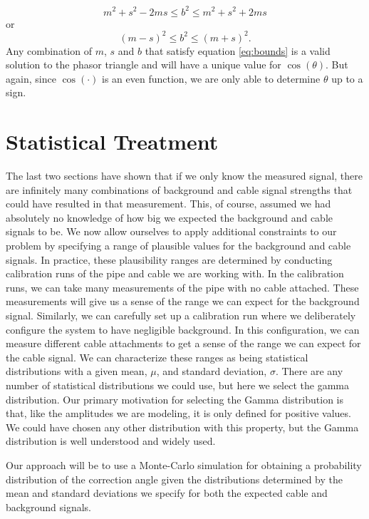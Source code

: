 \documentclass[paper=a4, fontsize=11pt]{scrartcl}
\numberwithin{equation}{section}		%
\numberwithin{figure}{section}			%
\numberwithin{table}{section}				%
\begin{document}
\begin{appendices}
\begin{equation*}
      m^2 + s^2 - 2 m s \leq b ^ 2 \leq  m^2 + s^2 + 2 m s
\end{equation*}
or
\begin{equation} \label{eq:bounds}
      \left(m-s\right)^2 \leq b ^ 2 \leq \left(m + s\right)^2.  
\end{equation}
Any combination of $m$, $s$ and $b$ that satisfy equation \ref{eq:bounds} is a valid solution to the phasor triangle and will have a unique value for $\cos\left(\theta\right)$.  But again, since $\cos\left(\cdot\right)$ is an even function, we are only able to determine $\theta$ up to a sign.
    
\section{Statistical Treatment}
The last two sections have shown that if we only know the measured signal, there are infinitely many combinations of background and cable signal strengths that could have resulted in that measurement.  This, of course, assumed we had absolutely no knowledge of how big we expected the background and cable signals to be.  We now allow ourselves to apply additional constraints to our problem by specifying a range of plausible values for the background and cable signals.  In practice, these plausibility ranges are determined by conducting calibration runs of the pipe and cable we are working with.  In the calibration runs, we can take many measurements of the pipe with no cable attached.  These measurements will give us a sense of the range we can expect for the background signal.  Similarly, we can carefully set up a calibration run where we deliberately configure the system to have negligible background.  In this configuration, we can measure different cable attachments to get a sense of the range we can expect for the cable signal.  We can characterize these ranges as being statistical distributions with a given mean, $\mu$, and standard deviation, $\sigma$. There are any number of statistical distributions we could use, but here we select the gamma distribution.  Our primary motivation for selecting the Gamma distribution is that, like the amplitudes we are modeling, it is only defined for positive values.  We could have chosen any other distribution with this property, but the Gamma distribution is well understood and widely used. 

\par Our approach will be to use a Monte-Carlo simulation for obtaining a probability distribution of the correction angle given the distributions determined by the mean and standard deviations we specify for both the expected cable and background signals.


\end{appendices}
\end{document}
